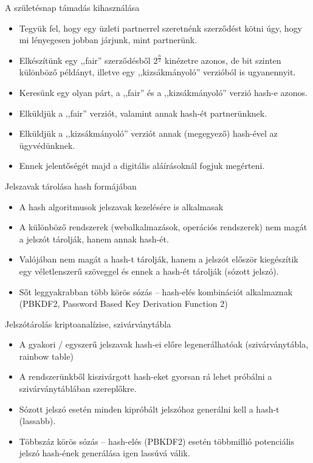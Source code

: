 \documentclass[12 pt]{beamer}
\begin{document}
\begin{frame}{A születésnap támadás kihasználása}
  \begin{itemize}
    \item{Tegyük fel, hogy egy üzleti partnerrel szeretnénk szerződést kötni úgy, hogy mi lényegesen jobban járjunk, mint partnerünk.}
    \item{Elkészítünk egy ,,fair'' szerződésből $2^\frac{n}{2}$ kinézetre azonos, de bit szinten különböző példányt, illetve egy ,,kizsákmányoló'' verzióból is ugyanennyit.}
    \item{Keresünk egy olyan párt, a ,,fair'' és a ,,kizsákmányoló'' verzió hash-e azonos.}
    \item{Elküldjük a ,,fair'' verziót, valamint annak hash-ét partnerünknek.}
    \item{Elküldjük a ,,kizsákmányoló'' verziót annak (megegyező) hash-ével az ügyvédünknek.}
    \item{Ennek jelentőségét majd a digitális aláírásoknál fogjuk megérteni.}
  \end{itemize}
\end{frame}

\begin{frame}{Jelszavak tárolása hash formájában}
  \begin{itemize}
    \item{A hash algoritmusok jelszavak kezelésére is alkalmasak}
    \item{A különböző rendszerek (webalkalmazások, operációs rendszerek) nem magát a jelszót tárolják, hanem annak hash-ét.}
    \item{Valójában nem magát a hash-t tárolják, hanem a jelszót először kiegészítik egy véletlenszerű szöveggel és ennek a hash-ét tárolják (sózott jelszó).}
    \item{Sőt leggyakrabban több körös sózás -- hash-elés kombinációt alkalmaznak (PBKDF2, Password Based Key Derivation Function 2)}
  \end{itemize}
\end{frame}

\begin{frame}{Jelszótárolás kriptoanalízise, szivárványtábla}
  \begin{itemize}
    \item{A gyakori / egyszerű jelszavak hash-ei előre legenerálhatóak (szivárványtábla, rainbow table)}
    \item{A rendszerünkből kiszivárgott hash-eket gyorsan rá lehet próbálni a szivárványtáblában szereplőkre.}
    \item{Sózott jelszó esetén minden kipróbált jelszóhoz generálni kell a hash-t (lassabb).}
    \item{Többszáz körös sózás -- hash-elés (PBKDF2) esetén többmillió potenciális jelszó hash-ének generálása igen lassúvá válik.}
  \end{itemize}
\end{frame}

\end{document}
